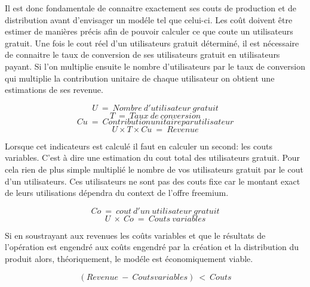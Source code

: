 \documentclass[11pt, a4paper ]{article}
\begin{document}
Il est donc fondamentale de connaitre exactement ses couts de production et de distribution avant d'envisager un modéle tel que celui-ci. Les coût doivent être estimer de manières précis afin de pouvoir calculer ce que coute un utilisateurs gratuit. Une fois le cout réel d'un utilisateurs gratuit déterminé, il est nécessaire de connaitre le taux de conversion de ses utilisateurs gratuit en utilisateurs payant. Si l'on multiplie ensuite le nombre d'utilisateurs par le taux de conversion qui multiplie la contribution unitaire de chaque utilisateur on obtient une estimations de ses revenue\cite{equationFreemium}.

\begin{equation}
	U\ =\ Nombre\ d'utilisateur\ gratuit
\end{equation}
\begin{equation}
	T\ =\ Taux\ de\ conversion
\end{equation}
\begin{equation}
	Cu\ =\ Contribution unitaire par utilisateur
\end{equation}
\begin{equation}
	U \times T \times Cu\ =\ Revenue
\end{equation}

Lorsque cet indicateurs est calculé il faut en calculer un second: les couts variables. C'est à dire une estimation du cout total des utilisateurs gratuit. Pour cela rien de plus simple multiplié le nombre de vos utilisateurs gratuit par le cout d'un utilisateurs. Ces utilisateurs ne sont pas des couts fixe car le montant exact de leurs utilisations dépendra du context de l'offre freemium.

\begin{equation}
	Co\ =\ cout\ d'un\ utilisateur\ gratuit
\end{equation}
\begin{equation}
	U\ \times\ Co\ =\ Couts\ variables
\end{equation}

Si en soustrayant aux revenues les coûts variables et que le résultats de l'opération est engendré aux coûts engendré par la création et la distribution du produit alors, théoriquement, le modéle est économiquement viable.

\begin{equation}
	(Revenue\ -\ Couts variables)\ <\ Couts 
\end{equation}
\end{document}
